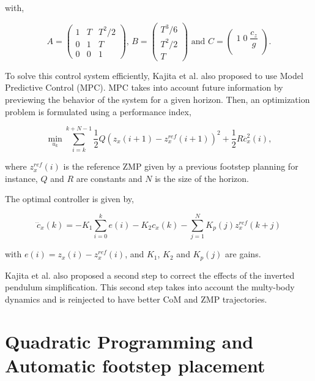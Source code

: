 with,

\begin{equation*}
 A = \left(
\begin{matrix}
1 & T & T^2/2 \\
0 & 1 & T \\
0 & 0 & 1
\end{matrix}
\right) \text{, }
{ B} = \left(
\begin{matrix}
T^3/6 \\
T^2/2 \\
T
\end{matrix}
\right) \text{ and }
{ C} = \left(
\begin{matrix}
1 \; 0 \; \dfrac{c_z}{g} \\
\end{matrix}
\right).
\end{equation*}

To solve this control system efficiently, Kajita et al. also  proposed to use Model Predictive Control (MPC). MPC takes into account future information by previewing the behavior of the system for a given horizon. Then, an optimization problem is formulated using a performance index,

\begin{equation}
\min_{u_k} \sum\limits_{i=k}^{k+N - 1} \frac{1}{2} Q (z_x(i+1) - z_x^{ref}(i+1))^2 + \frac{1}{2}R\dddot{c}_x^2(i),
\end{equation}

where $z_x^{ref}(i)$ is the reference ZMP given by a previous footstep planning for instance, $Q$ and $R$ are constants and $N$ is the size of the horizon.

The optimal controller is given by,

\begin{equation}
\dddot{c}_x(k) = -K_1 \sum\limits_{i=0}^{k} e(i)-K_2c_x(k) - \sum\limits_{j=1}^{N} K_p(j)z_x^{ref}(k+j)
\end{equation}

with $e(i) = z_x(i) - z_x^{ref}(i)$, and $K_1$, $K_2$ and $K_p(j)$ are gains.

Kajita et al. also proposed a second step to correct the effects of the inverted pendulum simplification. This second step takes into account the multy-body dynamics and is reinjected to have better CoM and ZMP trajectories.

\section{Quadratic Programming and Automatic footstep placement}

